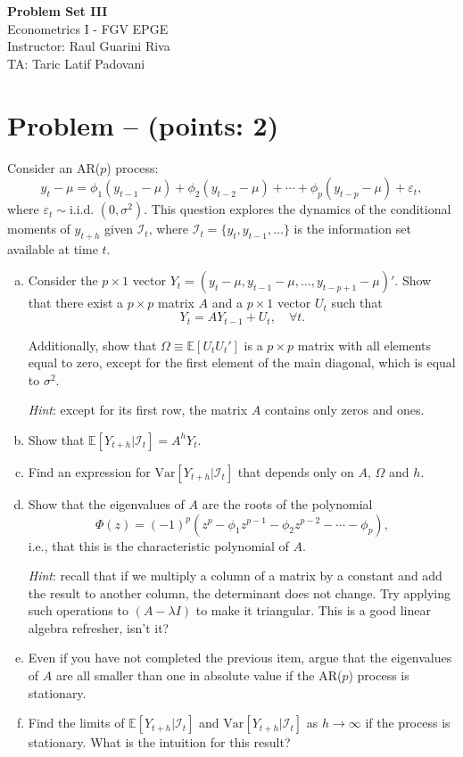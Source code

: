 \documentclass[11pt]{article}
\theoremstyle{definition}
\newcommand{\Var}{\mathrm{Var}}
\newcounter{problem}
\renewcommand{\theproblem}{\arabic{problem}}
\newcommand{\problem}[1]{
	\stepcounter{problem}
	\section*{Problem \theproblem{} -- (points: #1)}
}
\begin{document}
	\begin{center}
		{\LARGE{\textbf{Problem Set III}}}\\
		\vspace{0.2cm}
		Econometrics I - \textcolor{FGVBlue}{FGV EPGE}\\
		Instructor: Raul Guarini Riva \\
		TA: Taric Latif Padovani
	\end{center}

\problem{2}
Consider an AR($p$) process:
\begin{equation}
	y_t - \mu = \phi_1 (y_{t-1} - \mu) + \phi_2 (y_{t-2} - \mu) + \cdots + \phi_p (y_{t-p} - \mu) + \varepsilon_t,
	\label{eq:ar_p}
\end{equation}
where $\varepsilon_t \sim \text{i.i.d. } (0, \sigma^2)$. This question explores the dynamics of the conditional moments of $y_{t+h}$ given $\mathcal{I}_t$, where $\mathcal{I}_t = \{y_t, y_{t-1}, \ldots\}$ is the information set available at time $t$.

\begin{enumerate}[a)]
	\item Consider the $p \times 1$ vector $Y_t = (y_t - \mu, y_{t-1} - \mu, \ldots, y_{t-p+1} - \mu)'$. Show that there exist a $p \times p$ matrix $A$ and a $p \times 1$ vector $U_t$ such that
	\[Y_t = A Y_{t-1} + U_t, \quad \forall t.\]

	Additionally, show that $\Omega \equiv \mathbb{E}[U_tU_t']$ is a $p \times p$ matrix with all elements equal to zero, except for the first element of the main diagonal, which is equal to $\sigma^2$.

	\textit{Hint}: except for its first row, the matrix $A$ contains only zeros and ones.

	\item Show that $\mathbb{E}[Y_{t+h}|\mathcal{I}_t] = A^h Y_t$.
	\item Find an expression for $\Var[Y_{t+h}|\mathcal{I}_t]$ that depends only on $A$, $\Omega$ and $h$.
	\item Show that the eigenvalues of $A$ are the roots of the polynomial \[\Phi(z) = (-1)^{p}\left(z^p - \phi_1 z^{p-1} - \phi_2 z^{p-2} - \cdots - \phi_p\right),\] i.e., that this is the characteristic polynomial of $A$.
	
	\textit{Hint}: recall that if we multiply a column of a matrix by a constant and add the result to another column, the determinant does not change. Try applying such operations to $(A - \lambda I)$ to make it triangular. This is a good linear algebra refresher, isn't it?

	\item Even if you have not completed the previous item, argue that the eigenvalues of $A$ are all smaller than one in absolute value if the AR($p$) process is stationary.
	\item Find the limits of $\mathbb{E}[Y_{t+h}|\mathcal{I}_t]$ and $\Var[Y_{t+h}|\mathcal{I}_t]$ as $h \to \infty$ if the process is stationary. What is the intuition for this result?
\end{enumerate}
\end{document}
